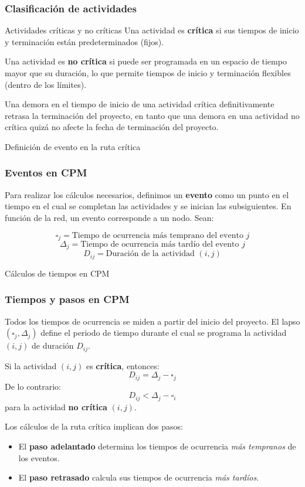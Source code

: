 \documentclass{beamer}
\begin{document}
\subsubsection{Clasificación de actividades}
\begin{frame}{Actividades críticas y no críticas}
    Una actividad es \textbf{crítica} si sus tiempos de inicio y terminación están predeterminados (fijos). 
    
    Una actividad es \textbf{no crítica} si puede ser programada en un espacio de tiempo mayor que su duración, 
    lo que permite tiempos de inicio y terminación flexibles (dentro de los límites). 
    
    Una demora en el tiempo de inicio de una actividad crítica definitivamente retrasa la terminación del proyecto, 
    en tanto que una demora en una actividad no crítica quizá no afecte la fecha de terminación del proyecto.
\end{frame}

\begin{frame}{Definición de evento en la ruta crítica}
    \subsubsection{Eventos en CPM}
    Para realizar los cálculos necesarios, definimos un \textbf{evento} como un punto en el tiempo en el cual se completan las actividades y se inician las subsiguientes. En función de la red, un evento corresponde a un nodo. Sean:

    \[
    \square_j = \text{Tiempo de ocurrencia más temprano del evento } j
    \]
    \[
    \Delta_j = \text{Tiempo de ocurrencia más tardío del evento } j
    \]
    \[
    D_{ij} = \text{Duración de la actividad } (i,j)
    \]

\end{frame}

\begin{frame}{Cálculos de tiempos en CPM}
    \subsubsection{Tiempos y pasos en CPM}
    Todos los tiempos de ocurrencia se miden a partir del inicio del proyecto. El lapso $(\square_j, \Delta_j)$ define el periodo de tiempo durante el cual se programa la actividad $(i,j)$ de duración $D_{ij}$. 

    Si la actividad $(i,j)$ es \textbf{crítica}, entonces:
    \[
    D_{ij} = \Delta_j - \square_j
    \]
    De lo contrario:
    \[
    D_{ij} < \Delta_j - \square_i
    \]
    para la actividad \textbf{no crítica} $(i,j)$. 
    
    Los cálculos de la ruta crítica implican dos pasos: 
    \begin{itemize}
        \item El \textbf{paso adelantado} determina los tiempos de ocurrencia \textit{más tempranos} de los eventos.
        \item El \textbf{paso retrasado} calcula sus tiempos de ocurrencia \textit{más tardíos}.
    \end{itemize}
\end{frame}
\end{document}
